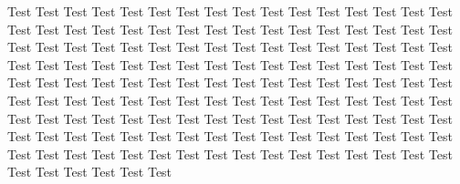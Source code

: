 \documentclass{amsbook}
\begin{document}
Test Test Test Test Test Test Test Test Test Test Test Test Test Test Test Test Test Test Test Test Test Test Test Test Test
Test Test Test Test Test Test Test Test Test Test Test Test Test Test Test Test Test Test Test Test Test Test Test Test Test
Test Test Test Test Test Test Test Test Test Test Test Test Test Test Test Test Test Test Test Test Test Test Test Test Test
Test Test Test Test Test Test Test Test Test Test Test Test Test Test Test Test Test Test Test Test Test Test Test Test Test
Test Test Test Test Test Test Test Test Test Test Test Test Test Test Test Test Test Test Test Test Test Test Test Test Test
Test Test Test Test Test Test Test Test Test Test Test Test Test Test Test Test Test Test Test Test Test Test Test Test Test
\end{document}
